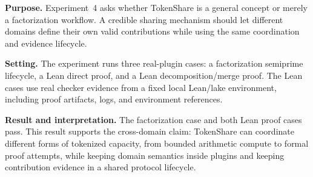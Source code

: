 \documentclass{article}
\theoremstyle{plain}
\begin{document}
{\color{blue}
\textbf{Purpose.} Experiment~4 asks whether TokenShare is a general concept or merely a factorization workflow. A credible sharing mechanism should let different domains define their own valid contributions while using the same coordination and evidence lifecycle.

\textbf{Setting.} The experiment runs three real-plugin cases: a factorization semiprime lifecycle, a Lean direct proof, and a Lean decomposition/merge proof. The Lean cases use real checker evidence from a fixed local Lean/lake environment, including proof artifacts, logs, and environment references.

\textbf{Result and interpretation.} The factorization case and both Lean proof cases pass. This result supports the cross-domain claim: TokenShare can coordinate different forms of tokenized capacity, from bounded arithmetic compute to formal proof attempts, while keeping domain semantics inside plugins and keeping contribution evidence in a shared protocol lifecycle.
}
\end{document}
